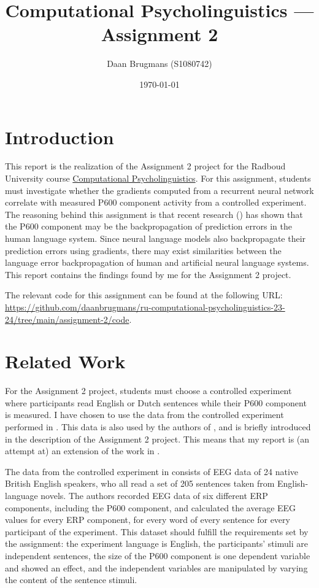 \documentclass{IEEEtran}
\begin{document}
\title{Computational Psycholinguistics --- Assignment 2}
\author{Daan Brugmans (S1080742)}
\date{\today}

\maketitle

\section{Introduction}
This report is the realization of the Assignment 2 project for the Radboud University course \href{https://www.ru.nl/courseguides/arts/courses/ma/rema-lc/let-rema-lcex28/}{Computational Psycholinguistics}.
For this assignment, students must investigate whether the gradients computed from a recurrent neural network correlate with measured P600 component activity from a controlled experiment.
The reasoning behind this assignment is that recent research (\cite{fitz2019erp,frank2024gradients}) has shown that the P600 component may be the backpropagation of prediction errors in the human language system.
Since neural language models also backpropagate their prediction errors using gradients, there may exist similarities between the language error backpropagation of human and artificial neural language systems.
This report contains the findings found by me for the Assignment 2 project.

The relevant code for this assignment can be found at the following URL: \url{https://github.com/daanbrugmans/ru-computational-psycholinguistics-23-24/tree/main/assignment-2/code}.

\section{Related Work}
For the Assignment 2 project, students must choose a controlled experiment where participants read English or Dutch sentences while their P600 component is measured.
I have chosen to use the data from the controlled experiment performed in \cite{frank2015erp}.
This data is also used by the authors of \cite{frank2024gradients}, and is briefly introduced in the description of the Assignment 2 project.
This means that my report is (an attempt at) an extension of the work in \cite{frank2024gradients}.

The data from the controlled experiment in \cite{frank2015erp} consists of EEG data of 24 native British English speakers, who all read a set of 205 sentences taken from English-language novels.
The authors recorded EEG data of six different ERP components, including the P600 component, and calculated the average EEG values for every ERP component, for every word of every sentence for every participant of the experiment.
This dataset should fulfill the requirements set by the assignment: the experiment language is English, the participants' stimuli are independent sentences, the size of the P600 component is one dependent variable and showed an effect, and the independent variables are manipulated by varying the content of the sentence stimuli.
\end{document}
